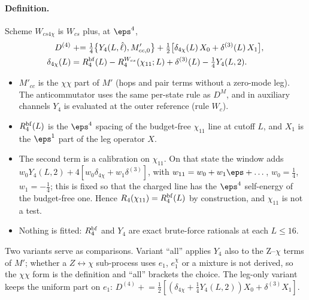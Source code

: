 \paragraph{Definition.} Scheme $W_{cs4\chi}$ is $W_{cs}$ plus, at $\eps^4$,
\begin{align}
 D^{(4)}&\mathrel{+}=\tfrac14\big\{Y_4(L,\hat\ell),M'_{cc,0}\big\}+\tfrac12\big[\delta_{4\chi}(L)\,X_0+\delta^{(3)}(L)\,X_1\big],
 \label{d2:eq:wcs4chi}\\
 \delta_{4\chi}(L)&=R^{\rm bf}_4(L)-R_4^{W_{cs}}(\chi_{11};L)+\delta^{(3)}(L)-\tfrac14Y_4(L,2).\nonumber
\end{align}
\begin{itemize}
\item $M'_{cc}$ is the $\chi\chi$ part of $M'$ (hops and pair terms without a zero-mode leg). The anticommutator uses the same
 per-state rule as $D^M$, and in auxiliary channels $Y_4$ is evaluated at the outer reference (rule $W_c$).
\item $R^{\rm bf}_4(L)$ is the $\eps^4$ spacing of the budget-free $\chi_{11}$ line at cutoff $L$, and $X_1$ is the $\eps^1$
 part of the leg operator $X$.
\item The second term is a calibration on $\chi_{11}$. On that state the window adds $w_0Y_4(L,2)+4[w_0\delta_{4\chi}+w_1
 \delta^{(3)}]$, with $w_{11}=w_0+w_1\eps+\dots$, $w_0=\frac14$, $w_1=-\frac14$; this is fixed so that the charged line has the
 $\eps^4$ self-energy of the budget-free one. Hence $R_4(\chi_{11})=R^{\rm bf}_4(L)$ by construction, and $\chi_{11}$ is not a
 test.
\item Nothing is fitted: $R^{\rm bf}_4$ and $Y_4$ are exact brute-force rationals at each $L\le16$.
\end{itemize}
Two variants serve as comparisons. Variant ``all'' applies $Y_4$ also to the Z--$\chi$ terms of $M'$; whether a
$Z\leftrightarrow\chi$ sub-process uses $e_1$, $e_1^\chi$ or a mixture is not derived, so the $\chi\chi$ form is the definition
and ``all'' brackets the choice. The leg-only variant keeps the uniform part on $e_1$:
$D^{(4)}\mathrel{+}=\frac12[(\delta_{4\chi}+\frac14Y_4(L,2))X_0+\delta^{(3)}X_1]$.

